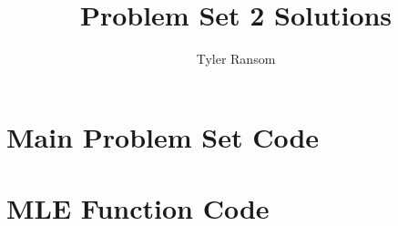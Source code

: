 \documentclass[12pt,english]{article}
\title{Problem Set 2 Solutions}
\author{Tyler Ransom}
\date{}
\begin{document}
\maketitle

\section{Main Problem Set Code}


\pagebreak{}
\section{MLE Function Code}




\end{document}
